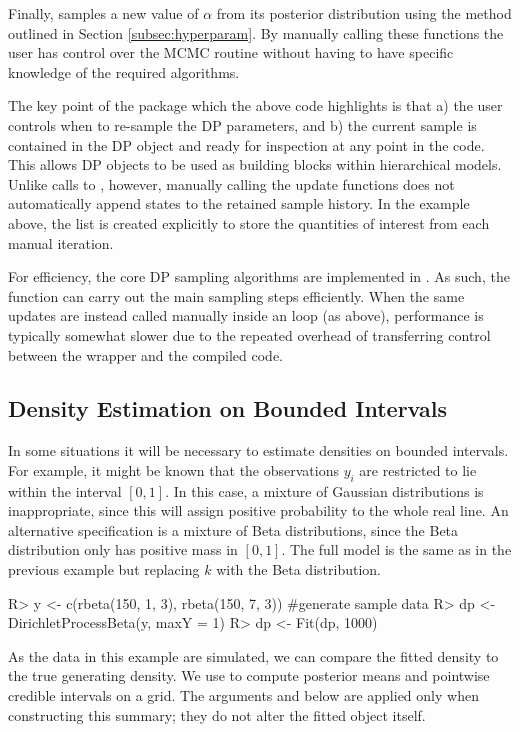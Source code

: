 \documentclass[nojss]{jss}
\begin{document}
Finally,  samples a new value of $\alpha$ from its posterior distribution using the method outlined in Section \ref{subsec:hyperparam}. By manually calling these functions the user has control over the MCMC routine without having to have specific knowledge of the required algorithms.

The key point of the   package which the above code highlights is that a) the user controls when to re-sample the DP parameters, and b) the current sample is contained in the DP object and ready for inspection at any point in the code. This allows DP objects to be used as building blocks within hierarchical models. Unlike calls to , however, manually calling the update functions does not automatically append states to the retained sample history. In the example above, the list  is created explicitly to store the quantities of interest from each manual iteration.

For efficiency, the core DP sampling algorithms are implemented in . As such, the  function can carry out the main sampling steps efficiently. When the same updates are instead called manually inside an  loop (as above), performance is typically somewhat slower due to the repeated overhead of transferring control between the  wrapper and the compiled  code.

\subsection{Density Estimation on Bounded Intervals}
In some situations it will be necessary to estimate densities on bounded intervals. For example, it might be known that the observations $y_i$ are restricted to lie within the interval $[0,1]$. In this case, a mixture of Gaussian distributions is inappropriate, since this will assign positive probability to the whole real line. An alternative specification is a mixture of Beta distributions, since the Beta distribution only has positive mass in $[0,1]$. The full model is the same as in the previous example but replacing $k$ with the Beta distribution.

\begin{CodeInput}
R> y <- c(rbeta(150, 1, 3), rbeta(150, 7, 3)) #generate sample data
R> dp <- DirichletProcessBeta(y, maxY = 1)
R> dp <- Fit(dp, 1000)
\end{CodeInput}

As the data in this example are simulated, we can compare the fitted density to the true generating density. We use  to compute posterior means and pointwise credible intervals on a grid. The arguments  and  below are applied only when constructing this summary; they do not alter the fitted object itself.
\end{document}
